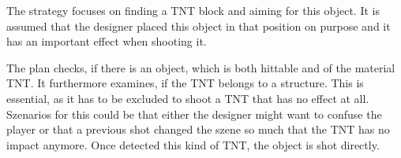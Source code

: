 The strategy  focuses on finding a TNT block and aiming for this object. It is assumed that the designer placed this object in that position on purpose and it has an important effect when shooting it.

The plan checks, if there is an object, which is both hittable and of the material TNT. It furthermore examines, if the TNT belongs to a structure. This is essential, as it has to be excluded to shoot a TNT that has no effect at all. Szenarios for this could be that either the designer might want to confuse the player or that a previous shot changed the szene so much that the TNT has no impact anymore. Once detected this kind of TNT, the object is shot directly.